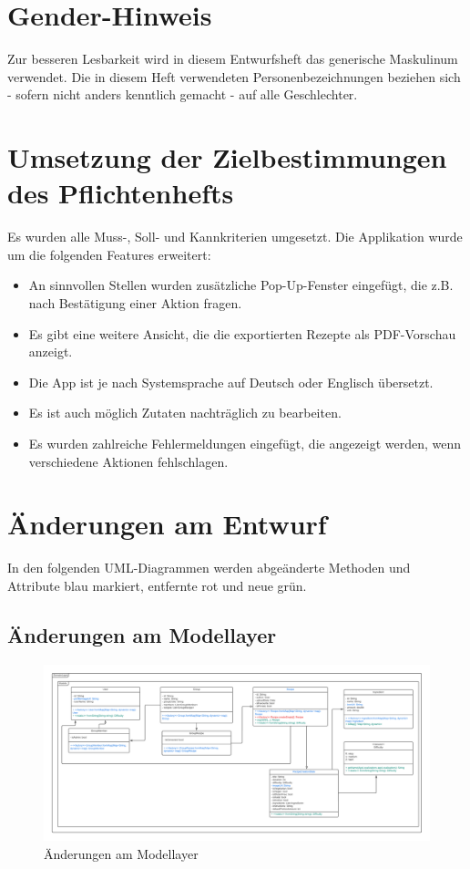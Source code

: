 \documentclass{implementierungsheft}
\begin{document}

\maketitle
\tableofcontents
\newpage

\section*{Gender-Hinweis}
Zur besseren Lesbarkeit wird in diesem Entwurfsheft das generische Maskulinum verwendet.
Die in diesem Heft verwendeten Personenbezeichnungen beziehen sich - sofern nicht anders kenntlich gemacht - auf alle Geschlechter.
\newpage

\section{Umsetzung der Zielbestimmungen des Pflichtenhefts}
Es wurden alle Muss-, Soll- und Kannkriterien umgesetzt. Die Applikation wurde um die folgenden Features erweitert:
\begin{itemize}
    \item An sinnvollen Stellen wurden zusätzliche Pop-Up-Fenster eingefügt, die z.B. nach Bestätigung einer Aktion fragen.
    \item Es gibt eine weitere Ansicht, die die exportierten Rezepte als PDF-Vorschau anzeigt.
    \item Die App ist je nach Systemsprache auf Deutsch oder Englisch übersetzt.
    \item Es ist auch möglich Zutaten nachträglich zu bearbeiten.
    \item Es wurden zahlreiche Fehlermeldungen eingefügt, die angezeigt werden, wenn verschiedene Aktionen fehlschlagen.
\end{itemize}
\newpage
\section{Änderungen am Entwurf}
In den folgenden UML-Diagrammen werden abgeänderte Methoden und Attribute blau markiert, entfernte rot und neue grün.
\subsection{Änderungen am Modellayer}
\begin{figure}[htp]
    \centering
    \includegraphics[width=\textwidth]{images/uml/modelLayer.pdf}
    \caption{Änderungen am Modellayer}
    \label{fig:modellayer}
\end{figure}
\end{document}

